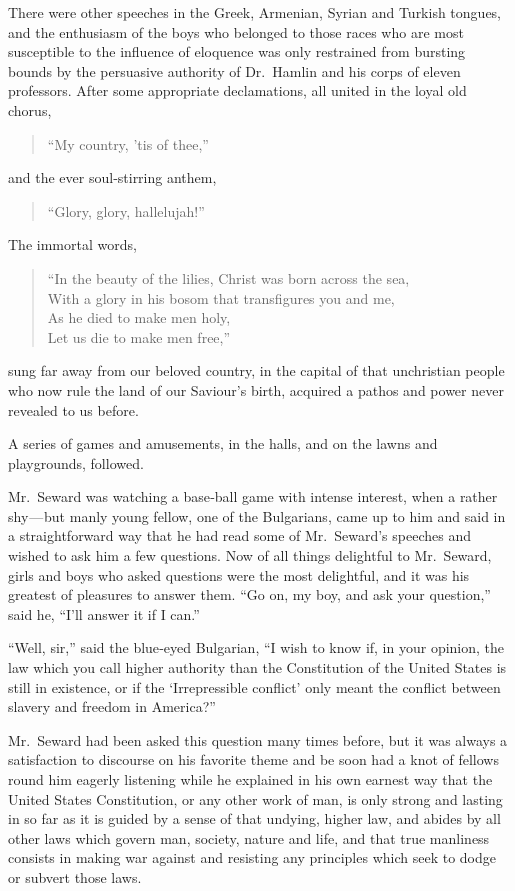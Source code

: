 \documentclass[12pt]{book}
\begin{document}
There were other speeches in the Greek, Armenian, Syrian and Turkish
tongues, and the enthusiasm of the boys who belonged to those races who are
most susceptible to the influence of eloquence was only restrained from bursting bounds by the persuasive authority of Dr.~Hamlin and his corps of eleven
professors. After some appropriate declamations, all united in the loyal old chorus,
\begin{quote}
“My country, ’tis of thee,”
\end{quote}
and the ever soul‐stirring anthem,
\begin{quote}
“Glory, glory, hallelujah!”
\end{quote}
The immortal words,
\begin{quote}
“In the beauty of the lilies, Christ was born across the sea, \\
With a glory in his bosom that transfigures you and me, \\
As he died to make men holy, \\
Let us die to make men free,”
\end{quote}
sung far away from our beloved country, in the capital of that unchristian
people who now rule the land of our Saviour’s birth, acquired a pathos and power
never revealed to us before.

A series of games and amusements, in the halls, and on the lawns and playgrounds, followed.

Mr.~Seward was watching a base‐ball game with intense interest, when a
rather shy — but manly young fellow, one of the Bulgarians, came up to him and
said in a straightforward way that he had read some of Mr.~Seward’s speeches and
wished to ask him a few questions. Now of all things delightful to Mr.~Seward,
girls and boys who asked questions were the most delightful, and it was his
greatest of pleasures to answer them. “Go on, my boy, and ask your question,”
said he, “I’ll answer it if I can.”

“Well, sir,” said the blue‐eyed Bulgarian, “I wish to know if, in your opinion,
the law which you call higher authority than the Constitution of the United States
is still in existence, or if the ‘Irrepressible conflict’ only meant the conflict between
slavery and freedom in America?”

Mr.~Seward had been asked this question many times before, but it was always
a satisfaction to discourse on his favorite theme and be soon had a knot of fellows
round him eagerly listening while he explained in his own earnest way that the
United States Constitution, or any other work of man, is only strong and lasting
in so far as it is guided by a sense of that undying, higher law, and abides by all
other laws which govern man, society, nature and life, and that true manliness
consists in making war against and resisting any principles which seek to dodge
or subvert those laws.
\end{document}
